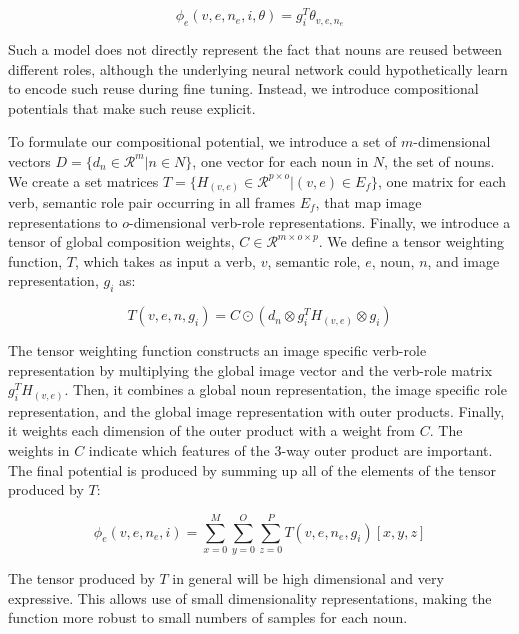 \documentclass[10pt,twocolumn,letterpaper]{article}
\begin{document}
\begin{equation}
\phi_e(v,e,n_e,i,\theta) = g_i^{T}\theta_{v,e,n_e}
\label{eqn:base_regression}
\end{equation}

Such a model does not directly represent the fact that nouns are reused between different roles, although the underlying neural network could hypothetically learn to encode such reuse during fine tuning. 
Instead, we introduce compositional potentials that make such reuse explicit. 


To formulate our compositional potential, we introduce a set of $m$-dimensional vectors $D = \{d_n \in \mathcal{R}^{m} | n \in N\}$, one vector for each noun in $N$, the set of nouns.
We create a set matrices $T = \{H_{(v,e)} \in \mathcal{R}^{p \times o} | (v,e) \in E_f\}$, one matrix for each verb, semantic role pair occurring in all frames $E_f$, that map image representations to $o$-dimensional verb-role representations.
Finally, we introduce a tensor of global composition weights, $C \in \mathcal{R}^{m \times o \times p}$.
We define a tensor weighting function, $T$, which takes as input a verb, $v$, semantic role, $e$, noun, $n$, and image representation, $g_i$ as:

\begin{equation}
T(v,e,n,g_i) = C \odot ( d_{n} \otimes g_i^{T}H_{(v,e)} \otimes g_i)
\label{eqn:tensor_feature}
\end{equation}

The tensor weighting function constructs an image specific verb-role representation by multiplying the global image vector and the verb-role matrix $g_i^{T}H_{(v,e)}$.  
Then, it combines a global noun representation, the image specific role representation, and the global image representation with outer products. 
Finally, it weights each dimension of the outer product with a weight from $C$. 
The weights in $C$ indicate which features of the 3-way outer product are important. 
The final potential is produced by summing up all of the elements of the tensor produced by $T$:

\begin{equation}
\phi_e(v,e,n_e,i) = \sum_{x=0}^{M}\sum_{y=0}^{O}\sum_{z=0}^{P} T(v,e,n_e,g_i)[x,y,z]
\label{eqn:tensor_sum}
\end{equation}

The tensor produced by $T$ in general will be high dimensional and very expressive.
This allows use of small dimensionality representations, making the function more robust to small numbers of samples for each noun.
\end{document}

